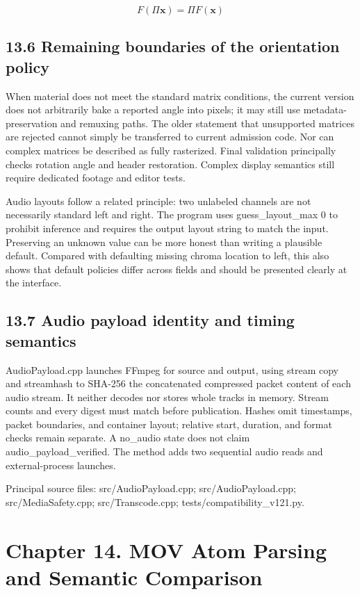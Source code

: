 \documentclass[11pt,a4paper,openany]{book}
\begin{document}
\begin{equation}
F(\Pi\mathbf{x})=\Pi F(\mathbf{x})
\end{equation}

\section*{13.6 Remaining boundaries of the orientation policy}
When material does not meet the standard matrix conditions, the current version does not arbitrarily bake a reported angle into pixels; it may still use metadata-preservation and remuxing paths. The older statement that unsupported matrices are rejected cannot simply be transferred to current admission code. Nor can complex matrices be described as fully rasterized. Final validation principally checks rotation angle and header restoration. Complex display semantics still require dedicated footage and editor tests.

Audio layouts follow a related principle: two unlabeled channels are not necessarily standard left and right. The program uses guess\_layout\_max 0 to prohibit inference and requires the output layout string to match the input. Preserving an unknown value can be more honest than writing a plausible default. Compared with defaulting missing chroma location to left, this also shows that default policies differ across fields and should be presented clearly at the interface.


\section*{13.7 Audio payload identity and timing semantics}
AudioPayload.cpp launches FFmpeg for source and output, using stream copy and streamhash to SHA-256 the concatenated compressed packet content of each audio stream. It neither decodes nor stores whole tracks in memory. Stream counts and every digest must match before publication. Hashes omit timestamps, packet boundaries, and container layout; relative start, duration, and format checks remain separate. A no\_audio state does not claim audio\_payload\_verified. The method adds two sequential audio reads and external-process launches.


\par\small Principal source files: src/AudioPayload.cpp; src/AudioPayload.cpp; src/MediaSafety.cpp; src/Transcode.cpp; tests/compatibility\_v121.py.\normalsize

\chapter*{Chapter 14. MOV Atom Parsing and Semantic Comparison}
\end{document}
